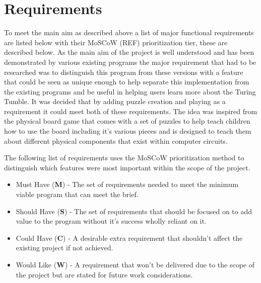\documentclass{l4proj}
\begin{document}
\section{Requirements}
To meet the main aim as described above a list of major functional requirements are listed below with their MoSCoW (REF) prioritization tier, these are described below. As the main aim of the project is well understood and has been demonstrated by various existing programs the major requirement that had to be researched was to distinguish this program from these versions with a feature that could be seen as unique enough to help separate this implementation from the existing programs and be useful in helping users learn more about the Turing Tumble. It was decided that by adding puzzle creation and playing as a requirement it could meet both of these requirements. The idea was inspired from the physical board game that comes with a set of puzzles to help teach children how to use the board including it's various pieces and is designed to teach them about different physical components that exist within computer circuits. 

The following list of requirements uses the MoSCoW prioritization method to distinguish which features were most important within the scope of the project. 
\begin{itemize}
    \item Must Have (\textbf{M}) - The set of requirements needed to meet the minimum viable program that can meet the brief.
    \item Should Have (\textbf{S}) - The set of requirements that should be focused on to add value to the program without it's success wholly reliant on it.
    \item Could Have (\textbf{C}) - A desirable extra requirement that shouldn't affect the existing project if not achieved.
    \item Would Like (\textbf{W}) - A requirement that won't be delivered due to the scope of the project but are stated for future work considerations.
\end{itemize}
\end{document}
